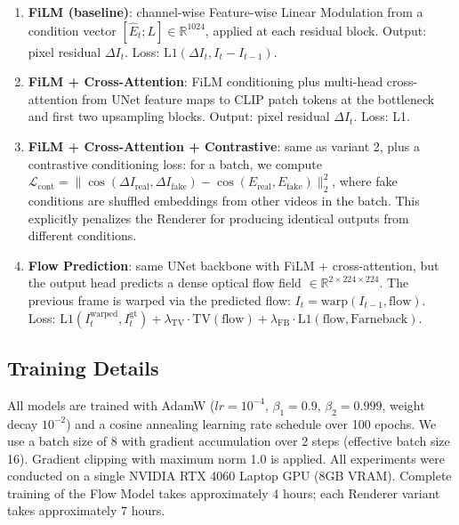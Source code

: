 \documentclass[10pt,twocolumn,letterpaper]{article}
\begin{document}
\begin{enumerate}
    \item \textbf{FiLM (baseline)}: channel-wise Feature-wise Linear
    Modulation from a condition vector $[\hat{E}_t; L] \in \mathbb{R}^{1024}$,
    applied at each residual block. Output: pixel residual $\Delta I_t$.
    Loss: $\text{L1}(\Delta I_t, I_t - I_{t-1})$.

    \item \textbf{FiLM + Cross-Attention}: FiLM conditioning plus
    multi-head cross-attention from UNet feature maps to CLIP patch tokens
    at the bottleneck and first two upsampling blocks. Output: pixel
    residual $\Delta I_t$. Loss: L1.

    \item \textbf{FiLM + Cross-Attention + Contrastive}: same as variant 2,
    plus a contrastive conditioning loss: for a batch, we compute
    $\mathcal{L}_{\text{cont}} = \|\cos(\Delta I_{\text{real}}, \Delta I_{\text{fake}}) - \cos(E_{\text{real}}, E_{\text{fake}})\|_2^2$,
    where fake conditions are shuffled embeddings from other videos in the
    batch. This explicitly penalizes the Renderer for producing identical
    outputs from different conditions.

    \item \textbf{Flow Prediction}: same UNet backbone with FiLM +
    cross-attention, but the output head predicts a dense optical flow field
    $\in \mathbb{R}^{2 \times 224 \times 224}$. The previous frame is warped
    via the predicted flow: $I_t = \text{warp}(I_{t-1}, \text{flow})$.
    Loss: $\text{L1}(I_t^{\text{warped}}, I_t^{\text{gt}}) + \lambda_{\text{TV}} \cdot \text{TV}(\text{flow}) + \lambda_{\text{FB}} \cdot \text{L1}(\text{flow}, \text{Farneback})$.
\end{enumerate}

\subsection{Training Details}

All models are trained with AdamW ($lr=10^{-4}$, $\beta_1=0.9$,
$\beta_2=0.999$, weight decay $10^{-2}$) and a cosine annealing learning
rate schedule over 100 epochs. We use a batch size of 8 with gradient
accumulation over 2 steps (effective batch size 16). Gradient clipping
with maximum norm 1.0 is applied. All experiments were conducted on a
single NVIDIA RTX 4060 Laptop GPU (8GB VRAM). Complete training of the Flow
Model takes approximately 4 hours; each Renderer variant takes
approximately 7 hours.
\end{document}
